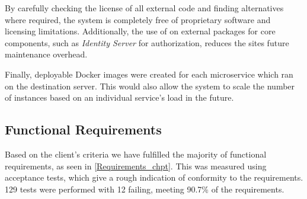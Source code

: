     \par
    By carefully checking the license of all external code and finding alternatives where required, the system is completely free of proprietary software and licensing limitations. Additionally, the use of on external packages for core components, such as \textit{Identity Server} for authorization, reduces the sites future maintenance overhead.

    Finally, deployable Docker images were created for each microservice which ran on the destination server. This would also allow the system to scale the number of instances based on an individual service's load in the future.

\subsection{Functional Requirements}
    \par
    Based on the client's criteria we have fulfilled the majority of functional requirements, as seen in \ref{Requirements_chpt}. This was measured using acceptance tests, which give a rough indication of conformity to the requirements. 129 tests were performed with 12 failing, meeting 90.7\% of the requirements.